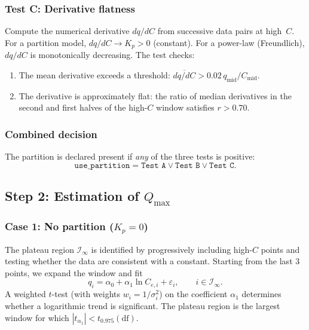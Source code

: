 \documentclass[12pt]{article}
\begin{document}
\subsubsection{Test C: Derivative flatness}

Compute the numerical derivative $dq/dC$ from successive data pairs
at high~$C$.  For a partition model, $dq/dC \to K_p > 0$ (constant).
For a power-law (Freundlich), $dq/dC$ is monotonically decreasing.
The test checks:
\begin{enumerate}[nosep]
  \item The mean derivative exceeds a threshold:
        $\overline{dq/dC} > 0.02\,q_{\mathrm{mid}}/C_{\mathrm{mid}}$.
  \item The derivative is approximately flat: the ratio of median
        derivatives in the second and first halves of the high-$C$
        window satisfies $r > 0.70$.
\end{enumerate}

\subsubsection{Combined decision}

The partition is declared present if \emph{any} of the three tests
is positive:
\begin{equation}
  \texttt{use\_partition}
  = \texttt{Test A} \lor \texttt{Test B} \lor \texttt{Test C}.
\end{equation}

\subsection{Step 2: Estimation of $Q_{\max}$}

\subsubsection{Case 1: No partition ($K_p = 0$)}

The plateau region $\mathcal{I}_\infty$ is identified by progressively
including high-$C$ points and testing whether the data are consistent
with a constant.  Starting from the last 3 points, we expand the
window and fit
\begin{equation}
  q_i = \alpha_0 + \alpha_1 \ln C_{e,i} + \varepsilon_i,
  \qquad i \in \mathcal{I}_\infty.
\end{equation}
A weighted $t$-test (with weights $w_i = 1/\sigma_i^2$) on the
coefficient $\alpha_1$ determines whether a logarithmic trend is
significant.  The plateau region is the largest window for which
$|t_{\alpha_1}| < t_{0.975}(\mathrm{df})$.
\end{document}
